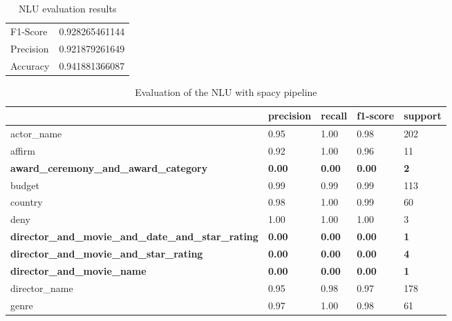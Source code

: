 \documentclass[11pt,a4paper]{article}
\begin{document}
\begin{table}[ht]
\centering
\caption{NLU evaluation results}
\label{results-spacy}
\begin{tabular}{|l|l|}
\hline
F1-Score  & 0.928265461144 \\
Precision & 0.921879261649 \\
Accuracy  & 0.941881366087 \\ \hline
\end{tabular}
\end{table}

\begin{table*}[ht]
\centering
\caption{Evaluation of the NLU with spacy pipeline}
\label{nlu-precision}
\begin{tabular}{|l|llll|}
\hline
                                                   & precision & recall & f1-score & support \\ \hline
actor\_name                                                 & 0.95          & 1.00          & 0.98          & 202         \\
affirm                                                      & 0.92          & 1.00          & 0.96          & 11          \\
\textbf{award\_ceremony\_and\_award\_category}              & \textbf{0.00} & \textbf{0.00} & \textbf{0.00} & \textbf{2}  \\
budget                                                      & 0.99          & 0.99          & 0.99          & 113         \\
country                                                     & 0.98          & 1.00          & 0.99          & 60          \\
deny                                                        & 1.00          & 1.00          & 1.00          & 3           \\
\textbf{director\_and\_movie\_and\_date\_and\_star\_rating} & \textbf{0.00} & \textbf{0.00} & \textbf{0.00} & \textbf{1}  \\
\textbf{director\_and\_movie\_and\_star\_rating}            & \textbf{0.00} & \textbf{0.00} & \textbf{0.00} & \textbf{4}  \\
\textbf{director\_and\_movie\_name}                         & \textbf{0.00} & \textbf{0.00} & \textbf{0.00} & \textbf{1}  \\
director\_name                                              & 0.95          & 0.98          & 0.97          & 178         \\
genre                                                       & 0.97          & 1.00          & 0.98          & 61          \\

\end{tabular}
\end{table*}
\end{document}
